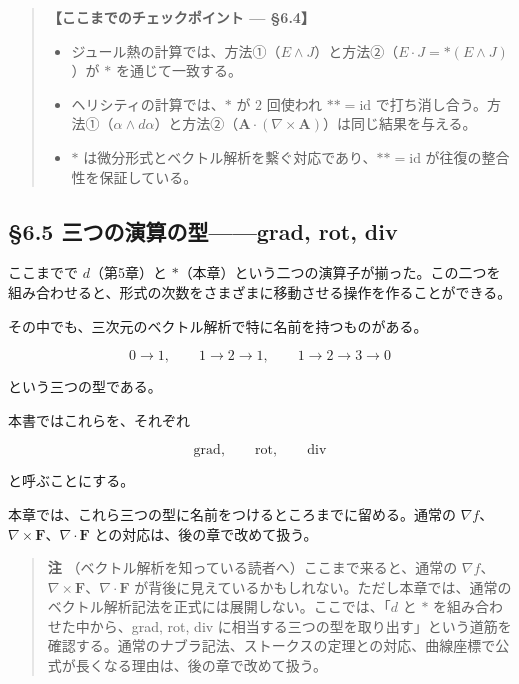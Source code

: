 \documentclass[a4paper,12pt,openany]{book}
\begin{document}
\begin{quote}
\textbf{【ここまでのチェックポイント — §6.4】}

\begin{itemize}
\item
  ジュール熱の計算では、方法①（\(E \wedge J\)）と方法②（\(E \cdot J = \ast(E \wedge J)\)）が
  \(\ast\) を通じて一致する。
\item
  ヘリシティの計算では、\(\ast\) が \(2\) 回使われ
  \(\ast\ast = \mathrm{id}\)
  で打ち消し合う。方法①（\(\alpha \wedge d\alpha\)）と方法②（\(\mathbf{A} \cdot (\nabla \times \mathbf{A})\)）は同じ結果を与える。
\item
  \(\ast\)
  は微分形式とベクトル解析を繫ぐ対応であり、\(\ast\ast = \mathrm{id}\)
  が往復の整合性を保証している。
\end{itemize}
\end{quote}

\par\vspace{0.35em}\par

\hypertarget{ux4e09ux3064ux306eux6f14ux7b97ux306eux578bgrad-rot-div}{%
\subsection{§6.5 三つの演算の型——grad, rot,
div}\label{ux4e09ux3064ux306eux6f14ux7b97ux306eux578bgrad-rot-div}}

ここまでで \(d\)（第5章）と
\(\ast\)（本章）という二つの演算子が揃った。この二つを組み合わせると、形式の次数をさまざまに移動させる操作を作ることができる。

その中でも、三次元のベクトル解析で特に名前を持つものがある。

\[
0 \to 1,\qquad
1 \to 2 \to 1,\qquad
1 \to 2 \to 3 \to 0
\]

という三つの型である。

本書ではこれらを、それぞれ

\[
\mathrm{grad},\qquad
\mathrm{rot},\qquad
\mathrm{div}
\]

と呼ぶことにする。

本章では、これら三つの型に名前をつけるところまでに留める。通常の
\(\nabla f\)、\(\nabla\times\mathbf F\)、\(\nabla\cdot\mathbf F\)
との対応は、後の章で改めて扱う。

\begin{quote}
\textbf{注} （ベクトル解析を知っている読者へ）ここまで来ると、通常の
\(\nabla f\)、\(\nabla\times\mathbf F\)、\(\nabla\cdot\mathbf F\)
が背後に見えているかもしれない。ただし本章では、通常のベクトル解析記法を正式には展開しない。ここでは、「\(d\)
と \(\ast\) を組み合わせた中から、grad, rot, div
に相当する三つの型を取り出す」という道筋を確認する。通常のナブラ記法、ストークスの定理との対応、曲線座標で公式が長くなる理由は、後の章で改めて扱う。
\end{quote}
\end{document}
